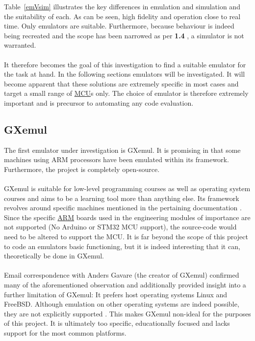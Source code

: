 Table~\ref{emVsim} illustrates the key differences in emulation and simulation and the suitability of each. As can be seen, high fidelity and operation close to real time. Only emulators are suitable. Furthermore, because behaviour is indeed being recreated and the scope has been narrowed as per \textbf{1.4 }, a simulator is not warranted. 
\\\\
It therefore becomes the goal of this investigation to find a suitable emulator for the task at hand. In the following sections emulators will be investigated. It will become apparent that these solutions are extremely specific in most cases and target a small range of \hyperref[listAbr]{MCU}s only. The choice of emulator is therefore extremely important and is precursor to automating any code evaluation.

\subsection{GXemul}
\label{GXemul}
The first emulator under investigation is GXemul. It is promising in that some machines using ARM processors have been emulated within its framework. Furthermore, the project is completely open-source. \cite{Gavare}
\\\\
GXemul is suitable for low-level programming courses as well as operating system courses and aims to be a learning tool more than anything else. Its framework revolves around specific machines mentioned in the pertaining documentation \cite{Gavare} \cite{gavareEmail}. Since the specific \hyperref[listAbr]{ARM} boards used in the engineering modules of importance are not supported (No Arduino or STM32 MCU support), the source-code would need to be altered to support the MCU. It is far beyond the scope of this project to code an emulators basic functioning, but it is indeed interesting that it can, theoretically be done in GXemul.
\\\\
Email correspondence with Anders Gavare (the creator of GXemul) confirmed many of the aforementioned observation and additionally provided insight into a further limitation of GXemul: It prefers host operating systems Linux and FreeBSD. Although emulation on other operating systems are indeed possible, they are not explicitly supported \cite{gavareEmail}. This makes GXemul non-ideal for the purposes of this project. It is ultimately too specific, educationally focused and lacks support for the most common platforms.
 
